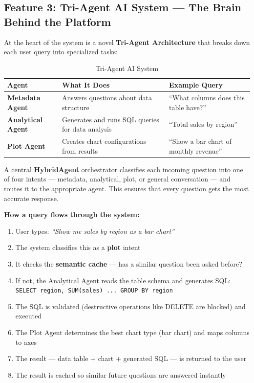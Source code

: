 \documentclass[12pt,a4paper]{report}
\begin{document}
\subsection{Feature 3: Tri-Agent AI System --- The Brain Behind the Platform}

At the heart of the system is a novel \textbf{Tri-Agent Architecture} that breaks down each user query into specialized tasks:

\begin{table}[H]
\centering
\caption{Tri-Agent AI System}
\begin{tabular}{>{\bfseries}p{3.5cm} p{4cm} p{5cm}}
\toprule
\textbf{Agent} & \textbf{What It Does} & \textbf{Example Query} \\
\midrule
Metadata Agent & Answers questions about data structure & ``What columns does this table have?'' \\
Analytical Agent & Generates and runs SQL queries for data analysis & ``Total sales by region'' \\
Plot Agent & Creates chart configurations from results & ``Show a bar chart of monthly revenue'' \\
\bottomrule
\end{tabular}
\label{tab:triagent}
\end{table}

A central \textbf{HybridAgent} orchestrator classifies each incoming question into one of four intents --- metadata, analytical, plot, or general conversation --- and routes it to the appropriate agent. This ensures that every question gets the most accurate response.

\textbf{How a query flows through the system:}
\begin{enumerate}[leftmargin=1.5cm]
    \item User types: \textit{``Show me sales by region as a bar chart''}
    \item The system classifies this as a \textbf{plot} intent
    \item It checks the \textbf{semantic cache} --- has a similar question been asked before?
    \item If not, the Analytical Agent reads the table schema and generates SQL: \texttt{SELECT region, SUM(sales) ... GROUP BY region}
    \item The SQL is validated (destructive operations like DELETE are blocked) and executed
    \item The Plot Agent determines the best chart type (bar chart) and maps columns to axes
    \item The result --- data table + chart + generated SQL --- is returned to the user
    \item The result is cached so similar future questions are answered instantly
\end{enumerate}
\end{document}
